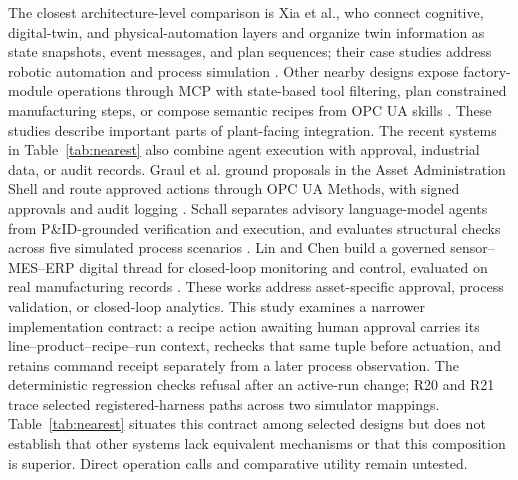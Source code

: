 The closest architecture-level comparison is Xia et al., who connect cognitive,
digital-twin, and physical-automation layers and organize twin information as
state snapshots, event messages, and plan sequences; their case studies
address robotic automation and process simulation
\cite{xia2025architecture}. Other nearby designs expose factory-module
operations through MCP with state-based tool filtering, plan constrained
manufacturing steps, or compose semantic recipes from OPC UA skills
\cite{koehle2026llmdriven,silva2025mcpmanufacturing,koehle2025semanticrecipes}.
These studies describe important parts of plant-facing integration. The
recent systems in Table~\ref{tab:nearest} also combine agent execution with
approval, industrial data, or audit records. Graul et al. ground proposals in
the Asset Administration Shell and route approved actions through OPC UA
Methods, with signed approvals and audit logging
\cite{graul2026aas}. Schall separates advisory language-model agents from
P\&ID-grounded verification and execution, and evaluates structural checks
across five simulated process scenarios
\cite{schall2026safe}. Lin and Chen build a governed sensor--MES--ERP digital
thread for closed-loop monitoring and control, evaluated on real manufacturing
records \cite{lin2026agentic}. These works address asset-specific approval,
process validation, or closed-loop analytics. This study examines a narrower
implementation contract: a recipe action awaiting human approval carries its
line--product--recipe--run context, rechecks that same tuple before actuation,
and retains command receipt separately from a later process observation. The
deterministic regression checks refusal after an active-run change; R20 and
R21 trace selected registered-harness paths across two simulator mappings.
Table~\ref{tab:nearest} situates this contract among selected designs but does
not establish that other systems lack equivalent mechanisms or that this
composition is superior. Direct operation calls and comparative utility
remain untested.
